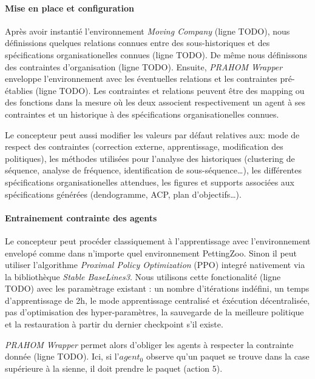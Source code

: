 \documentclass[demonstration]{jfsma}
\newcounter{relation}
\begin{document}
\paragraph{Mise en place et configuration}

Après avoir instantié l'environnement \emph{Moving Company} (ligne TODO), nous définissions quelques relations connues entre des sous-historiques et des spécifications organisationelles connues (ligne TODO). De même nous définissons des contraintes d'organisation (ligne TODO). Ensuite, \emph{PRAHOM Wrapper} enveloppe l'environnement avec les éventuelles relations et les contraintes pré-établies (ligne TODO). Les contraintes et relations peuvent être des mapping ou des fonctions dans la mesure où les deux associent respectivement un agent à ses contraintes et un historique à des spécifications organisationelles connues.

Le concepteur peut aussi modifier les valeurs par défaut relatives aux: mode de respect des contraintes (correction externe, apprentissage, modification des politiques), les méthodes utilisées pour l'analyse des historiques (clustering de séquence, analyse de fréquence, identification de sous-séquence\dots), les différentes spécifications organisationelles attendues, les figures et supports associées aux spécifications générées (dendogramme, ACP, plan d'objectifs\dots).

\paragraph{Entrainement contrainte des agents}

Le concepteur peut procéder classiquement à l'apprentissage avec l'environnement envelopé comme dans n'importe quel environnement PettingZoo. Sinon il peut utiliser l'algorithme \emph{Proximal Policy Optimization} (PPO) integré nativement via la bibliothèque \emph{Stable BaseLines3}. Nous utilisons cette fonctionalité (ligne TODO) avec les paramètrage existant  : un nombre d'itérations indéfini, un temps d'apprentissage de 2h, le mode apprentissage centralisé et éxécution décentralisée, pas d'optimisation des hyper-paramètres, la sauvegarde de la meilleure politique et la restauration à partir du dernier checkpoint s'il existe.

\emph{PRAHOM Wrapper} permet alors d'obliger les agents à respecter la contrainte donnée (ligne TODO). Ici, si l'$agent_0$ observe qu'un paquet se trouve dans la case supérieure à la sienne, il doit prendre le paquet (action $5$).
\end{document}

